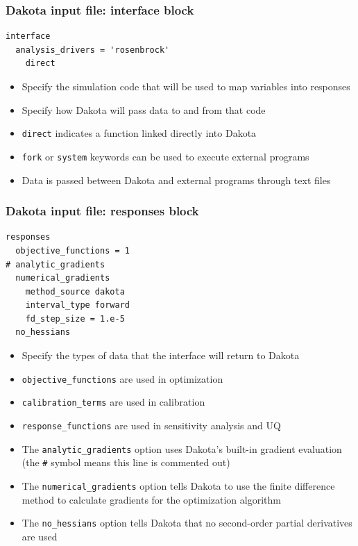 \documentclass[t]{beamer}
\begin{document}
\begin{frame}[fragile]
  \frametitle{Dakota input file: interface block}
  \begin{small}\begin{lstlisting}
interface
  analysis_drivers = 'rosenbrock'
    direct\end{lstlisting}\end{small}
  \begin{itemize}
    \item Specify the simulation code that will be used to map variables into
          responses
    \item Specify how Dakota will pass data to and from that code
    \item \lstinline{direct} indicates a function linked directly into Dakota
    \item \lstinline{fork} or \lstinline{system} keywords can be used to execute
          external programs
    \item Data is passed between Dakota and external programs through text files
  \end{itemize}
\end{frame}


\begin{frame}[fragile]
  \frametitle{Dakota input file: responses block}
  \vskip -2mm
  \begin{small}\begin{lstlisting}
responses
  objective_functions = 1
# analytic_gradients
  numerical_gradients
    method_source dakota
    interval_type forward
    fd_step_size = 1.e-5
  no_hessians\end{lstlisting}\end{small}
  \begin{footnotesize}\begin{itemize}
    \item Specify the types of data that the interface will return to Dakota
    \item \lstinline{objective_functions} are used in optimization
    \item \lstinline{calibration_terms} are used in calibration
    \item \lstinline{response_functions} are used in sensitivity analysis and UQ
    \item The \lstinline{analytic_gradients} option uses Dakota's built-in
          gradient evaluation (the \lstinline{#} symbol means this line is
          commented out)
    \item The \lstinline{numerical_gradients} option tells Dakota to use the
          finite difference method to calculate gradients for the optimization
          algorithm
    \item The \lstinline{no_hessians} option tells Dakota that no second-order
          partial derivatives are used
  \end{itemize}\end{footnotesize}
\end{frame}
\end{document}
